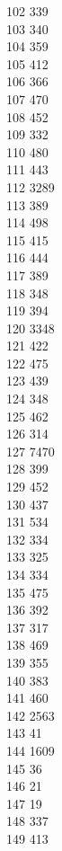 { 102	339 \\
 103	340 \\
 104	359 \\
 105	412 \\
 106	366 \\
 107	470 \\
 108	452 \\
 109	332 \\
 110	480 \\
 111	443 \\
 112	3289 \\
 113	389 \\
 114	498 \\
 115	415 \\
 116	444 \\
 117	389 \\
 118	348 \\
 119	394 \\
 120	3348 \\
 121	422 \\
 122	475 \\
 123	439 \\
 124	348 \\
 125	462 \\
 126	314 \\
 127	7470 \\
 128	399 \\
 129	452 \\
 130	437 \\
 131	534 \\
 132	334 \\
 133	325 \\
 134	334 \\
 135	475 \\
 136	392 \\
 137	317 \\
 138	469 \\
 139	355 \\
 140	383 \\
 141	460 \\
 142	2563 \\
 143	41 \\
 144	1609 \\
 145	36 \\
 146	21 \\
 147	19 \\
 148	337 \\
 149	413 \\
}
